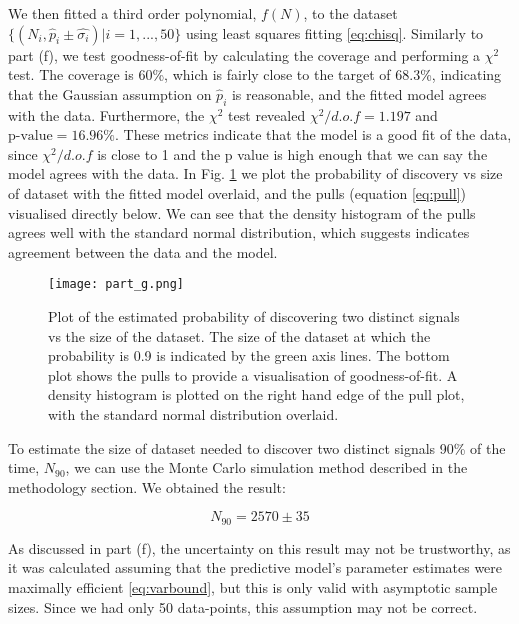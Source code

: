 \documentclass{article}
\begin{document}
We then fitted a third order polynomial, $f(N)$, to the dataset $\{(N_i, \hat{p}_i \pm \hat{\sigma_i})| i = 1, ..., 50\}$ using least squares fitting \ref{eq:chisq}. Similarly to part (f), we test goodness-of-fit by calculating the coverage and performing a $\chi^2$ test. The coverage is 60\%, which is fairly close to the target of 68.3\%, indicating that the Gaussian assumption on $\hat{p}_i$ is reasonable, and the fitted model agrees with the data. Furthermore, the $\chi^2$ test revealed $\chi^2/d.o.f = 1.197$ and $\text{p-value} = 16.96\%$. These metrics indicate that the model is a good fit of the data, since $\chi^2/d.o.f$ is close to 1 and the p value is high enough that we can say the model agrees with the data. In Fig. \ref{fig:g} we plot the probability of discovery vs size of dataset with the fitted model overlaid, and the pulls (equation \ref{eq:pull}) visualised directly below. We can see that the density histogram of the pulls agrees well with the standard normal distribution, which suggests indicates agreement between the data and the model. 

\begin{figure}[h]
\centering
\texttt{[image: part\_g.png]}
\caption{Plot of the estimated probability of discovering two distinct signals vs the size of the dataset. The size of the dataset at which the probability is 0.9 is indicated by the green axis lines. The bottom plot shows the pulls to provide a visualisation of goodness-of-fit. A density histogram is plotted on the right hand edge of the pull plot, with the standard normal distribution overlaid.}
\label{fig:g}
\end{figure} 

To estimate the size of dataset needed to discover two distinct signals 90\% of the time, $N_{90}$, we can use the Monte Carlo simulation method described in the methodology section. We obtained the result:

$$ N_{90} = 2570 \pm 35 $$

As discussed in part (f), the uncertainty on this result may not be trustworthy, as it was calculated assuming that the predictive model's parameter estimates were maximally efficient \ref{eq:varbound}, but this is only valid with asymptotic sample sizes. Since we had only 50 data-points, this assumption may not be correct. 

\end{document}
